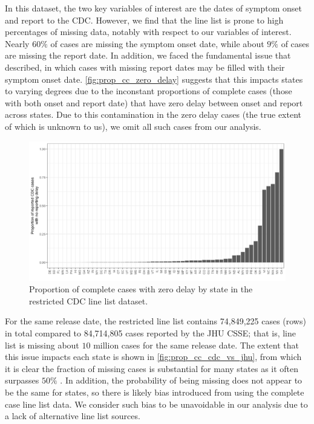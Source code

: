 \documentclass{article}
\begin{document}
In this dataset, the two key variables of interest are the dates of symptom
onset and report to the CDC. However, we find that the line list is prone to
high percentages of missing data, notably with respect to our variables of
interest. Nearly $60\%$ of cases are missing the symptom onset date, while about
$9\%$ of cases are missing the report date. In addition, we faced the
fundamental issue that \citet{jahja2022real} described, in which cases with
missing report dates may be filled with their symptom onset date.
\autoref{fig:prop_cc_zero_delay} suggests that this impacts states
to varying degrees due to the inconstant proportions of complete cases (those with
both onset and report date) that have zero delay between onset and report across
states. Due to this contamination in the zero delay cases (the true extent of
which is unknown to us), we omit all such cases from our analysis.

\begin{figure}[!tb]
\centering
    \includegraphics[width=.99\textwidth]{prop_cc_zero_delay.pdf}
    \caption{Proportion of complete cases with zero delay by state in the 
    restricted CDC line list dataset.}
    \label{fig:prop_cc_zero_delay}
\end{figure}

For the same release date, the restricted line list contains 74,849,225 cases
(rows) in total compared to 84,714,805 cases reported by the JHU CSSE; that is,
line list is missing about $10$ million cases for the same release date. The
extent that this issue impacts each state is shown in
\autoref{fig:prop_cc_cdc_vs_jhu}, from which it is clear the fraction of missing
cases is substantial for many states as it often surpasses $50\%$
\citep{jahja2022real}. In addition, the probability of being missing does not
appear to be the same for states, so there is likely bias introduced from using
the complete case line list data. We consider such bias to be unavoidable in our
analysis due to a lack of alternative line list sources.
\end{document}
